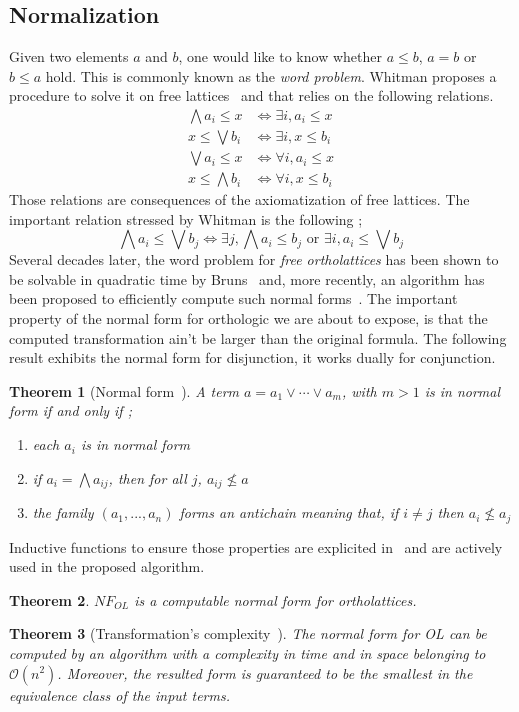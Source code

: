 \documentclass[a4paper, 11pt]{article}
\newtheorem{theorem}{Theorem}
\begin{document}
    \subsection{Normalization}
    Given two elements $a$ and $b$, one would like to know whether $a\leq b$, $a=b$ or 
    $b\leq a$ hold. This is commonly known as the \textit{word problem}. Whitman proposes a procedure to
    solve it on free lattices~\cite{43df3167-5a81-387d-88d7-2d29cdf1c881} and that relies on
    the following relations.
    \begin{align}
	    \bigwedge a_i\leq x&\Leftrightarrow\exists i,a_i\leq x\\
	    x\leq\bigvee b_i&\Leftrightarrow\exists i,x\leq b_i\\
	    \bigvee a_i\leq x&\Leftrightarrow\forall i,a_i\leq x\\
	    x\leq\bigwedge b_i&\Leftrightarrow\forall i,x\leq b_i
    \end{align}
    Those relations are consequences of the axiomatization of free lattices. The important relation
    stressed by Whitman is the following ;
    \[
	    \bigwedge a_i\leq\bigvee b_j\Leftrightarrow\exists j,\bigwedge a_i\leq b_j\text{ or }
	    \exists i,a_i\leq\bigvee b_j
    \]
    Several decades later, the word problem for \textit{free ortholattices} has been shown to be 
    solvable in quadratic time by Bruns~\cite{Bruns_1976} and, more recently, an algorithm has 
    been proposed to efficiently compute such normal forms~\cite{10.1007/978-3-031-37709-9_19}. The
    important property of the normal form for orthologic we are about to expose, is that the
    computed transformation ain't be larger than the original formula. The following result exhibits
    the normal form for disjunction, it works dually for conjunction.
    \begin{theorem}[Normal form~\cite{free_lattices_ams}]
    A term $a=a_1\vee\cdots\vee a_m$, with $m>1$ is in normal form if and only if ;
    \begin{enumerate}
	    \item
		    each $a_i$ is in normal form
	    \item
		    if $a_i=\bigwedge a_{ij}$, then for all $j$, $a_{ij}\not\leq a$
	    \item
		    the family $(a_1,...,a_n)$ forms an antichain meaning that, if $i\neq j$ then 
		    $a_i\not\leq a_j$
    \end{enumerate}
    \end{theorem}
    Inductive functions to ensure those properties are explicited in~\cite{10.1007/978-3-031-37709-9_19}
    and are actively used in the proposed algorithm.
    \begin{theorem}
	    $NF_{OL}$ is a computable normal form for ortholattices.
    \end{theorem}
    \begin{theorem}[Transformation's complexity~\cite{10.1007/978-3-031-37709-9_19}]
	    The normal form for OL can be computed by an algorithm with a complexity in time and in space
	    belonging to $\mathcal{O}(n^2)$. Moreover, the resulted form
	    is guaranteed to be the smallest in the equivalence class of the input terms.
    \end{theorem}
\end{document}
